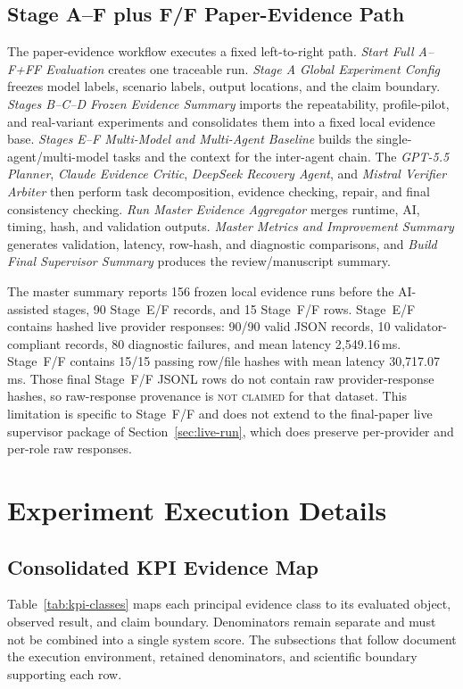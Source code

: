 \documentclass[journal]{IEEEtran}
\newcommand{\Eabsent}{\textsc{not claimed}}
\begin{document}
\subsection{Stage A--F plus F/F Paper-Evidence Path}
The paper-evidence workflow executes a fixed left-to-right path.
\emph{Start Full A--F+FF Evaluation} creates one traceable run.
\emph{Stage A Global Experiment Config} freezes model labels, scenario labels,
output locations, and the claim boundary.
\emph{Stages B--C--D Frozen Evidence Summary} imports the repeatability,
profile-pilot, and real-variant experiments and consolidates them into a
fixed local evidence base.
\emph{Stages E--F Multi-Model and Multi-Agent Baseline} builds the
single-agent/multi-model tasks and the context for the inter-agent chain.
The \emph{GPT-5.5 Planner}, \emph{Claude Evidence Critic},
\emph{DeepSeek Recovery Agent}, and \emph{Mistral Verifier Arbiter} then
perform task decomposition, evidence checking, repair, and final consistency
checking. \emph{Run Master Evidence Aggregator} merges runtime, AI, timing,
hash, and validation outputs. \emph{Master Metrics and Improvement Summary}
generates validation, latency, row-hash, and diagnostic comparisons, and
\emph{Build Final Supervisor Summary} produces the review/manuscript summary.

The master summary reports 156 frozen local evidence runs before the
AI-assisted stages, 90 Stage~E/F records, and 15 Stage~F/F rows. Stage~E/F
contains hashed live provider responses: 90/90 valid JSON records, 10
validator-compliant records, 80 diagnostic failures, and mean latency
2{,}549.16\,ms. Stage~F/F contains 15/15 passing row/file hashes with mean
latency 30{,}717.07\,ms. Those final Stage~F/F JSONL rows do not contain raw
provider-response hashes, so raw-response provenance is \Eabsent{} for that
dataset. This limitation is specific to Stage~F/F and does not extend to the
final-paper live supervisor package of Section~\ref{sec:live-run}, which does
preserve per-provider and per-role raw responses.

\section{Experiment Execution Details}
\label{sec:experiments}

\subsection{Consolidated KPI Evidence Map}
Table~\ref{tab:kpi-classes} maps each principal evidence class to its evaluated
object, observed result, and claim boundary. Denominators remain separate and
must not be combined into a single system score. The subsections that follow
document the execution environment, retained denominators, and scientific
boundary supporting each row.
\end{document}
